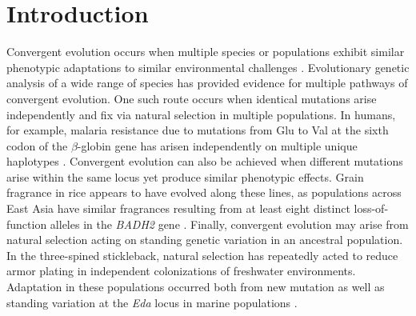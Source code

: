 \section*{Introduction}
\noindent Convergent evolution occurs when multiple species or populations exhibit similar phenotypic adaptations to similar environmental challenges \cite[]{Wood_2005_15881688,Arendt_2008_18022278,Elmer_2011_21459472}.
Evolutionary genetic analysis of a wide range of species has provided evidence for multiple pathways of convergent evolution. 
One such route occurs when identical mutations arise independently and fix via natural selection in multiple populations. 
In humans, for example, malaria resistance due to mutations from Glu to Val at the sixth codon of the $\beta$-globin gene has arisen independently on multiple unique haplotypes  \cite[]{Currat_2002_11741197,Kwiatkowski_2005_16001361}.  
Convergent evolution can also be achieved when different mutations arise within the same locus yet produce similar phenotypic effects.  
Grain fragrance in rice appears to have evolved along these lines, as populations across East Asia have similar fragrances resulting from at least eight distinct loss-of-function alleles in the  \emph{BADH2} gene \cite[]{Kovach_2009_19706531}.  
Finally, convergent evolution may arise from natural selection acting on standing genetic variation in an ancestral population.  
In the three-spined stickleback, natural selection has repeatedly acted to reduce armor plating in independent colonizations of freshwater environments.  
Adaptation in these populations occurred both from new mutation as well as standing variation at the \emph{Eda} locus in marine populations \cite[]{Colosimo_2005_15790847}.  


